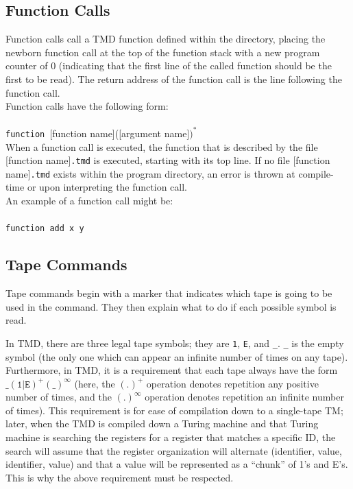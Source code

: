 \documentclass[11pt]{article}
\begin{document}
\subsection{Function Calls}

Function calls call a TMD function defined within the directory, placing the newborn function call at the top of the function stack with a new program counter of 0 (indicating that the first line of the called function should be the first to be read). The return address of the function call is the line following the function call. \\

Function calls have the following form: \\ \\
\texttt{function }[function name]([argument name]$)^*$ \\

When a function call is executed, the function that is described by the file [function name]\texttt{.tmd} is executed, starting with its top line. If no file [function name]\texttt{.tmd} exists within the program directory, an error is thrown at compile-time or upon interpreting the function call. \\ 

An example of a function call might be: \\ \\
\texttt{function add x y}

\subsection{Tape Commands}

Tape commands begin with a marker that indicates which tape is going to be used in the command. They then explain what to do if each possible symbol is read.

In TMD, there are three legal tape symbols; they are \texttt{1}, \texttt{E}, and \texttt{\_}. \texttt{\_} is the empty symbol (the only one which can appear an infinite number of times on any tape). Furthermore, in TMD, it is a requirement that each tape always have the form $\texttt{\_}(\texttt{1}|\texttt{E})^{+}(\texttt{\_})^{\infty}$ (here, the $(.)^+$ operation denotes repetition any positive number of times, and the $(.)^\infty$ operation denotes repetition an infinite number of times). This requirement is for ease of compilation down to a single-tape TM; later, when the TMD is compiled down a Turing machine and that Turing machine is searching the registers for a register that matches a specific ID, the search will assume that the register organization will alternate (identifier, value, identifier, value) and that a value will be represented as a ``chunk'' of 1's and E's. This is why the above requirement must be respected. \\
\end{document}
